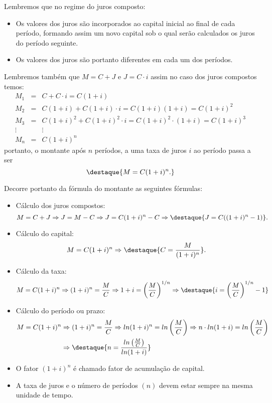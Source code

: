  Lembremos que no regime do juros composto:
 \begin{itemize}
  \item Os valores dos juros são incorporados ao capital inicial ao final de cada período, formando assim um novo capital sob o qual serão calculados os juros do período seguinte.
  \item Os valores dos juros são portanto diferentes em cada um dos períodos.
 \end{itemize}
 Lembremos também que $M= C+J$ e $J= C \cdot i$ assim no caso dos juros compostos temos:
 \begin{eqnarray*}
  M_1&=& C + C \cdot i = C(1+i) \\
  M_2&=& C(1+i) + C(1+i)\cdot i = C(1+i)(1+i)= C(1+i)^2\\
  M_3&=& C(1+i)^2 + C(1+i)^2\cdot i= C(1+i)^2 \cdot (1+i) = C(1+i)^3 \\
  \vdots & & \vdots\\
  M_n&=& C(1+i)^n
 \end{eqnarray*}
 portanto, o montante após $n$ períodos, a uma taxa de juros $i$ ao período passa a ser
 \[\destaque{M= C(1+i)^n.}\]

 Decorre portanto da fórmula do montante as seguintes fórmulas:
 \begin{itemize}
  \item Cálculo dos juros compostos:
  \[M=C+J \Rightarrow J= M-C \Rightarrow J= C(1+i)^n - C \Rightarrow \destaque{J= C((1+i)^n - 1)}.\]
  \item Cálculo do capital:
  \[M= C(1+i)^n \Rightarrow \destaque{C= \frac{M}{(1+i)^n}}.\]
  \item Cálculo da taxa:
  \[M= C(1+i)^n \Rightarrow (1+i)^n= \frac{M}{C} \Rightarrow 1+i= \left(\frac{M}{C}\right)^{1/n} \Rightarrow \destaque{i= \left(\frac{M}{C}\right)^{1/n} -1}\]
  \item Cálculo do período ou prazo:
  \begin{align*}
  M= C(1+i)^n & \Rightarrow (1+i)^n= \frac{M}{C} \Rightarrow ln(1+i)^n= ln\left(\frac{M}{C}\right) \Rightarrow n \cdot ln(1+i)= ln\left(\frac{M}{C}\right) \\
  & \Rightarrow \destaque{n= \frac{ln\left(\frac{M}{C}\right)}{ln(1+i)}}
  \end{align*}
 \end{itemize}

 \begin{obs}
 \begin{itemize}
  \item O fator $(1+i)^n$ é chamado fator de acumulação de capital.
  \item A taxa de juros e o número de períodos $(n)$ devem estar sempre na mesma unidade de tempo.
 \end{itemize}
 \end{obs}

 \newpage
